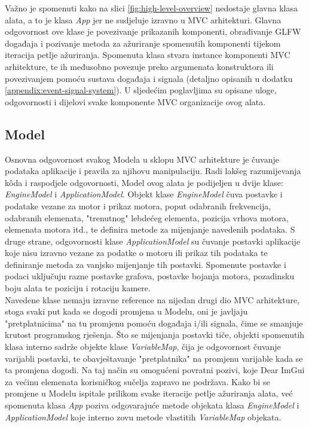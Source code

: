 \documentclass[times, utf8, diplomski]{fer}
\begin{document}
Važno je spomenuti kako na slici \ref{fig:high-level-overview} nedostaje glavna klasa alata, a to je klasa \textit{App} jer ne sudjeluje izravno u MVC arhitekturi. Glavna odgovornost ove klase je povezivanje prikazanih komponenti, obrađivanje GLFW događaja i pozivanje metoda za ažuriranje spomenutih komponenti tijekom iteracija petlje ažuriranja. Spomenuta klasa stvara instance komponenti MVC arhitekture, te ih međusobno povezuje preko argumenata konstruktora ili povezivanjem pomoću sustava događaja i signala (detaljno opisanih u dodatku \ref{appendix:event-signal-system}). U sljedećim poglavljima su opisane uloge, odgovornosti i dijelovi svake komponente MVC organizacije ovog alata.

\subsection{Model}
Osnovna odgovornost svakog Modela u sklopu MVC arhitekture je čuvanje podataka aplikacije i pravila za njihovu manipulaciju. Radi lakšeg razumijevanja k\^{o}da i raspodjele odgovornosti, Model ovog alata je podijeljen u dvije klase: \textit{EngineModel} i \textit{ApplicationModel}. Objekt klase \textit{EngineModel} čuva postavke i podatake vezane za motor i prikaz motora, poput odabranih frekvencija, odabranih elemenata, "trenutnog" lebdećeg elementa, pozicija vrhova motora, elemenata motora itd., te definira metode za mijenjanje navedenih podataka. S druge strane, odgovornosti klase \textit{ApplicationModel} su čuvanje postavki aplikacije koje nisu izravno vezane za podatke o motoru ili prikaz tih podataka te definiranje metoda za vanjsko mijenjanje tih postavki. Spomenute postavke i podaci uključuju razne postavke grafova, postavke bojanja motora, pozadinsku boju alata te poziciju i rotaciju kamere.\\

Navedene klase nemaju izravne reference na nijedan drugi dio MVC arhitekture, stoga svaki put kada se dogodi promjena u Modelu, oni je javljaju "pretplatnicima" na tu promjenu pomoću događaja i/ili signala, čime se smanjuje krutost programskog rješenja. Što se mijenjanja postavki tiče, objekti spomenutih klasa interno sadrže objekte klase \textit{VariableMap}, čija je odgovornost čuvanje varijabli postavki, te obavještavanje "pretplatnika" na promjenu varijable kada se ta promjena dogodi. Na taj način su omogućeni povratni pozivi, koje Dear ImGui za većinu elemenata korisničkog sučelja zapravo ne podržava. Kako bi se promjene u Modelu ispitale prilikom svake iteracije petlje ažuriranja alata, već spomenuta klasa \textit{App} poziva odgovarajuće metode objekata klasa \textit{EngineModel} i \textit{ApplicationModel} koje interno zovu metode vlastitih \textit{VariableMap} objekata.
\end{document}
